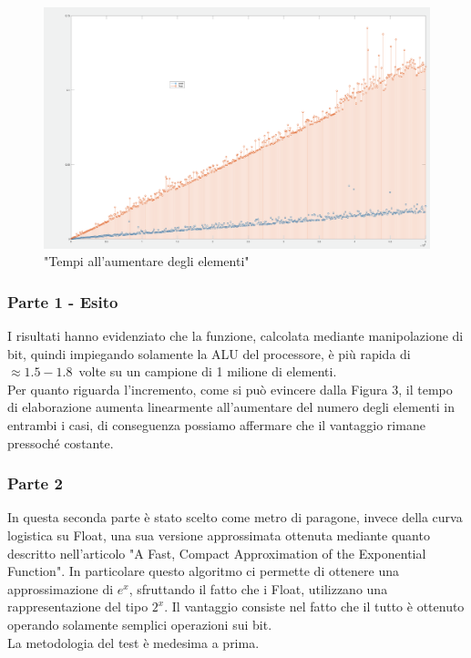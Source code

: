 \documentclass[a4paper,11pt]{article}
\begin{document}
\begin{figure}[h]
	\includegraphics[scale=0.15]{tempi}
	\centering
	\caption{"Tempi all'aumentare degli elementi"}
\end{figure}


\subsubsection{Parte 1 - Esito}


I risultati hanno evidenziato che la funzione, calcolata mediante manipolazione di bit, quindi impiegando solamente la ALU del processore, è più rapida di $\approx1.5-1.8$\ volte su un campione di 1 milione di elementi. \\
Per quanto riguarda l'incremento, come si può evincere dalla Figura 3, il tempo di elaborazione aumenta linearmente all'aumentare del numero degli elementi in entrambi i casi, di conseguenza possiamo affermare che il vantaggio rimane pressoché costante.

 
\subsubsection{Parte 2}

In questa seconda parte è stato scelto come metro di paragone, invece della curva logistica su Float, una sua versione approssimata ottenuta mediante quanto descritto nell'articolo "A Fast, Compact Approximation of the Exponential Function"\cite{afast}. In particolare questo algoritmo ci permette di ottenere una approssimazione di $e^{x}$, sfruttando il fatto che i Float, utilizzano una rappresentazione del tipo $2^x$. Il vantaggio consiste nel fatto che il tutto è ottenuto operando solamente semplici operazioni sui bit.\\
La metodologia del test è medesima a prima.
\end{document}

